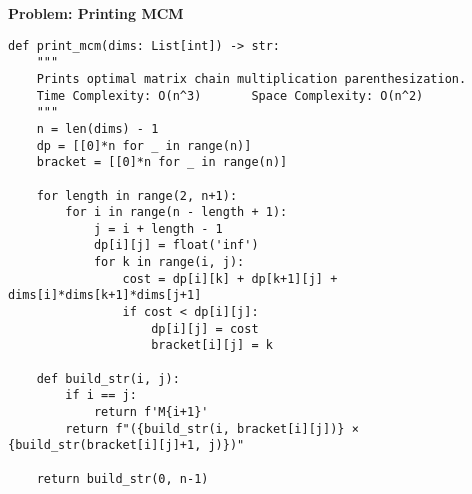 \noindent\textbf{Problem: Printing MCM}
\begin{verbatim}
def print_mcm(dims: List[int]) -> str:
    """
    Prints optimal matrix chain multiplication parenthesization.
    Time Complexity: O(n^3)       Space Complexity: O(n^2)
    """
    n = len(dims) - 1
    dp = [[0]*n for _ in range(n)]
    bracket = [[0]*n for _ in range(n)]
    
    for length in range(2, n+1):
        for i in range(n - length + 1):
            j = i + length - 1
            dp[i][j] = float('inf')
            for k in range(i, j):
                cost = dp[i][k] + dp[k+1][j] + dims[i]*dims[k+1]*dims[j+1]
                if cost < dp[i][j]:
                    dp[i][j] = cost
                    bracket[i][j] = k
    
    def build_str(i, j):
        if i == j:
            return f'M{i+1}'
        return f"({build_str(i, bracket[i][j])} × {build_str(bracket[i][j]+1, j)})"
    
    return build_str(0, n-1)
\end{verbatim}

